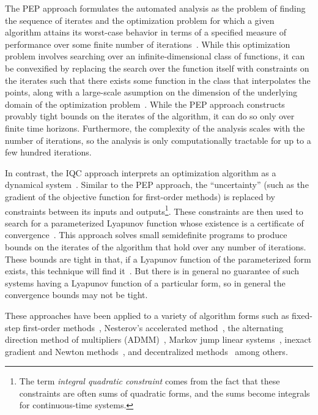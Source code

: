 \documentclass{juliacon}
\begin{document}
The PEP approach formulates the automated analysis as the problem of finding the sequence of iterates and the optimization problem for which a given algorithm attains its worst-case behavior in terms of a specified measure of performance over some finite number of iterations~\cite{drori-teboulle}. While this optimization problem involves searching over an infinite-dimensional class of functions, it can be convexified by replacing the search over the function itself with constraints on the iterates such that there exists some function in the class that interpolates the points, along with a large-scale asumption on the dimension of the underlying domain of the optimization problem~\cite{pep}. While the PEP approach constructs provably tight bounds on the iterates of the algorithm, it can do so only over finite time horizons. Furthermore, the complexity of the analysis scales with the number of iterations, so the analysis is only computationally tractable for up to a few hundred iterations.

In contrast, the IQC approach interprets an optimization algorithm as a dynamical system~\cite{lessard16}. Similar to the PEP approach, the ``uncertainty'' (such as the gradient of the objective function for first-order methods) is replaced by constraints between its inputs and outputs\footnote{The term \textit{integral quadratic constraint} comes from the fact that these constraints are often sums of quadratic forms, and the sums become integrals for continuous-time systems.}. These constraints are then used to search for a parameterized Lyapunov function whose existence is a certificate of convergence~\cite{taylor2018lyapunov}. This approach solves small semidefinite programs to produce bounds on the iterates of the algorithm that hold over any number of iterations. These bounds are tight in that, if a Lyapunov function of the parameterized form exists, this technique will find it~\cite{taylor2018lyapunov}. But there is in general no guarantee of such systems having a Lyapunov function of a particular form, so in general the convergence bounds may not be tight.

These approaches have been applied to a variety of algorithm forms such as fixed-step first-order methods~\cite{pep}, Nesterov's accelerated method~\cite{hu-lessard2017}, the alternating direction method of multipliers (ADMM)~\cite{admm,iqcadmm_ICML}, Markov jump linear systems~\cite{hu-syed2019}, inexact gradient and Newton methods~\cite{deklerk-glineur-taylor2020}, and decentralized methods~\cite{colla-hendrickx2023} among others.
\end{document}
